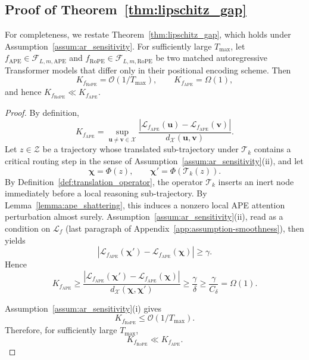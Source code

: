 \subsection{Proof of Theorem~\ref{thm:lipschitz_gap}}
\label{app:proof-lipschitz-gap}

For completeness, we restate Theorem~\ref{thm:lipschitz_gap}, which holds under Assumption~\ref{assum:ar_sensitivity}.
For sufficiently large $T_{\max}$, let 
$f_{\mathrm{APE}} \in \mathcal{F}_{L,m,\mathrm{APE}}$ and 
$f_{\mathrm{RoPE}} \in \mathcal{F}_{L,m,\mathrm{RoPE}}$ 
be two matched autoregressive Transformer models that differ only in their positional encoding scheme. Then
\begin{equation}
K_{f_{\mathrm{RoPE}}} = \mathcal{O}(1/T_{\max}),
\qquad
K_{f_{\mathrm{APE}}} = \Omega(1),
\end{equation}
and hence $K_{f_{\mathrm{RoPE}}} \ll K_{f_{\mathrm{APE}}}$.

\begin{proof}
By definition,
\begin{equation}
K_{f_{\mathrm{APE}}}
=
\sup_{\boldsymbol{u}\neq \boldsymbol{v}\in\mathcal{X}}
\frac{
|\mathcal{L}_{f_{\mathrm{APE}}}(\boldsymbol{u})-\mathcal{L}_{f_{\mathrm{APE}}}(\boldsymbol{v})|
}{
d_{\mathcal{X}}(\boldsymbol{u},\boldsymbol{v})
}.
\end{equation}
Let $z \in \mathcal{Z}$ be a trajectory whose translated sub-trajectory under $\mathcal{T}_k$ contains a critical routing step in the sense of Assumption~\ref{assum:ar_sensitivity}(ii), and let
\begin{equation}
\boldsymbol{\chi} = \Phi(z),
\qquad
\boldsymbol{\chi}' = \Phi(\mathcal{T}_k(z)).
\end{equation}
By Definition~\ref{def:translation_operator}, the operator $\mathcal{T}_k$ inserts an inert node immediately before a local reasoning sub-trajectory. By Lemma~\ref{lemma:ape_shattering}, this induces a nonzero local APE attention perturbation almost surely. Assumption~\ref{assum:ar_sensitivity}(ii), read as a condition on $\mathcal{L}_f$ (last paragraph of Appendix~\ref{app:assumption-smoothness}), then yields
\begin{equation}
|\mathcal{L}_{f_{\mathrm{APE}}}(\boldsymbol{\chi}')-\mathcal{L}_{f_{\mathrm{APE}}}(\boldsymbol{\chi})|
\ge \gamma.
\end{equation}
Hence
\begin{equation}
K_{f_{\mathrm{APE}}}
\ge
\frac{
|\mathcal{L}_{f_{\mathrm{APE}}}(\boldsymbol{\chi}')-\mathcal{L}_{f_{\mathrm{APE}}}(\boldsymbol{\chi})|
}{
d_{\mathcal{X}}(\boldsymbol{\chi},\boldsymbol{\chi}')
}
\ge
\frac{\gamma}{\delta}
\ge
\frac{\gamma}{C_\delta}
=
\Omega(1).
\end{equation}

Assumption~\ref{assum:ar_sensitivity}(i) gives
\begin{equation}
K_{f_{\mathrm{RoPE}}} \le \mathcal{O}(1/T_{\max}).
\end{equation}
Therefore, for sufficiently large $T_{\max}$,
\begin{equation}
K_{f_{\mathrm{RoPE}}} \ll K_{f_{\mathrm{APE}}}.
\end{equation}
\end{proof}

